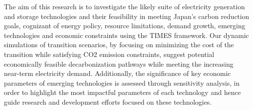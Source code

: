 The aim of this research is to investigate the likely suite of electricity generation and storage technologies and their feasibility in meeting Japan's carbon reduction goals, cognizant of energy policy, resource limitations, demand growth, emerging technologies and economic constraints using the TIMES framework. Our dynamic simulations of transition scenarios, by focusing on minimizing the cost of the transition while satisfying CO2 emission constraints, suggest potential economically feasible decarbonization pathways while meeting the increasing near-term electricity demand. Additionally, the significance of key economic parameters of emerging technologies is assessed through sensitivity analysis, in order to highlight the most impactful parameters of each technology and hence guide research and development efforts focused on these technologies.
